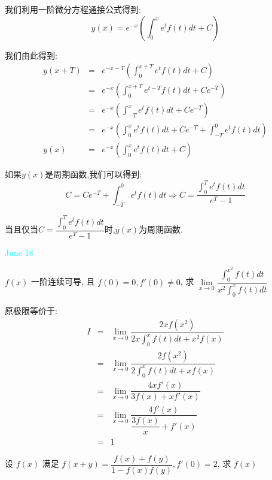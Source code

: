 \begin{solution}
	
	我们利用一阶微分方程通接公式得到: 
	$$y(x)=e^{-x}(\int_{0}^{x}e^tf(t)dt+C)$$
	
	我们由此得到: 
	\begin{eqnarray*}
		y(x+T)&=&e^{-x-T}(\int_{0}^{x+T}e^tf(t)dt+C)\\
		&=&e^{-x}(\int_{0}^{x+T}e^{t-T}f(t)dt+Ce^{-T})\\
		&=&e^{-x}(\int_{-T}^{x}e^{t}f(t)dt+Ce^{-T})\\
		&=&e^{-x}(\int_{0}^{x}e^{t}f(t)dt+Ce^{-T}+\int_{-T}^{0}e^{t}f(t)dt)\\
		y(x)&=&e^{-x}(\int_{0}^{x}e^tf(t)dt+C)
	\end{eqnarray*}
	
	如果$y(x)$是周期函数,我们可以得到: 
	$$C=Ce^{-T}+\int_{-T}^{0}e^{t}f(t)dt\Rightarrow C=\dfrac{\int_{0}^{T}e^{t}f(t)dt}{e^{T}-1}$$
	
	当且仅当$C=\dfrac{\int_{0}^{T}e^{t}f(t)dt}{e^{T}-1}$时,$y(x)$为周期函数.
\end{solution}


\textcolor{cyan}{June 18}

\begin{example}[][Exam: 32.3.7]
	$f(x)$ 一阶连续可导, 且 $f(0)=0,f'(0)\neq 0$, 求 $\lim\limits_{x\to 0}\dfrac{\int_{0}^{x^2}f(t)dt}{x^2\int_{0}^{x}f(t)dt}$
\end{example}
\begin{solution}
	
	原极限等价于: 
	\begin{eqnarray*}
		I&=&\lim\limits_{x\to 0}\dfrac{2xf(x^2)}{2x\int_{0}^{x}f(t)dt+x^2f(x)}\\
		&=&\lim\limits_{x\to 0}\dfrac{2f(x^2)}{2\int_{0}^{x}f(t)dt+xf(x)}\\
		&=&\lim\limits_{x\to 0}\dfrac{4xf'(x)}{3f(x)+xf'(x)}\\
		&=&\lim\limits_{x\to 0}\dfrac{4f'(x)}{\dfrac{3f(x)}{x}+f'(x)}\\
		&=&1
	\end{eqnarray*}
\end{solution}

\begin{example}[][Exam: 32.3.8]
	设 $f(x)$ 满足 $f(x+y)=\dfrac{f(x)+f(y)}{1-f(x)f(y)}, f'(0)=2$, 求 $f(x)$
\end{example}

